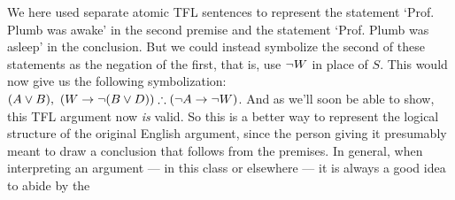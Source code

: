 We here used separate atomic TFL sentences to represent the statement `Prof. Plumb was awake' in the second premise and the statement `Prof. Plumb was asleep' in the conclusion.  But we could instead symbolize the second of these statements as the negation of the first, that is, use $\neg W$ in place of $S$.  This would now give us the following symbolization: $(A \vee B), \ (W \rightarrow \neg(B \vee D)) \therefore (\neg A \rightarrow \neg W)$.  And as we'll soon be able to show, this TFL argument now \emph{is} valid.  So this is a better way to represent the logical structure of the original English argument, since the person giving it presumably meant to draw a conclusion that follows from the premises.  In general, when interpreting an argument --- in this class or elsewhere --- it is always a good idea to abide by the 



